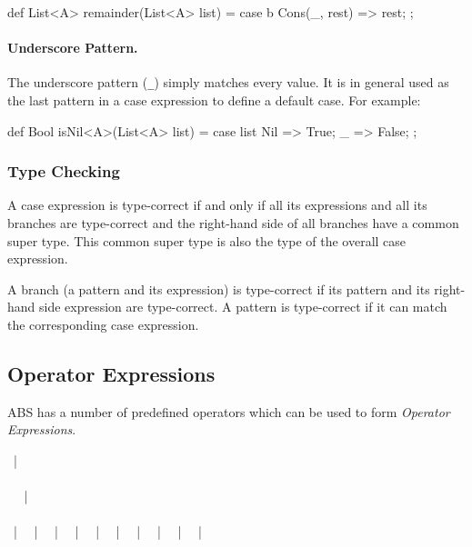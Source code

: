 \begin{abscode}
def List<A> remainder(List<A> list) =
  case b {
    Cons(_, rest) => rest;
  };
\end{abscode}

\paragraph{Underscore Pattern.}
The underscore pattern (\verb!_!) simply matches every value. 
It is in general used as the last pattern in a case expression to define a default case.
For example:
\begin{abscode}
def Bool isNil<A>(List<A> list) =
  case list {
    Nil => True;
    _ => False;
  };
\end{abscode}



\subsubsection{Type Checking}
A case expression is type-correct if and only if all its expressions and all its branches are type-correct and the right-hand side of all branches have a common super type. This common super type is also the type of the overall case expression. 

A branch (a pattern and its expression) is type-correct if its pattern and its right-hand side expression are type-correct.
A pattern is type-correct if it can match the corresponding case expression.

\subsection{Operator Expressions}
ABS has a number of predefined operators which can be used to form \emph{Operator Expressions}.

\begin{abssyntax}
  {}
              ~|~ \\
     {}\ \\
      \verb*_ _ ~|~ \TRS{-}\\
    {}\ \ \\
     \TRS{==} ~|~ \TRS{!=} ~|~ \TRS{<} ~|~ \TRS{<=} ~|~ \TRS{>} ~|~ \TRS{>=} ~|~ \TRS{+} ~|~ \TRS{-} ~|~ \TRS{*} ~|~ \TRS{/} ~|~ \TRS{\%}
\end{abssyntax}

